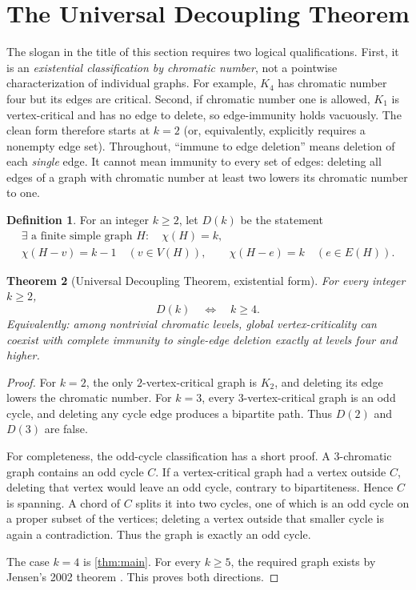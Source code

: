 \documentclass[10pt]{amsart}
\newtheorem{theorem}{Theorem}[section]
\theoremstyle{definition}
\newtheorem{definition}[theorem]{Definition}
\begin{document}
\section{The Universal Decoupling Theorem}\label{sec:universal}

The slogan in the title of this section requires two logical qualifications.
First, it is an \emph{existential classification by chromatic number}, not a
pointwise characterization of individual graphs.  For example, $K_4$ has
chromatic number four but its edges are critical.  Second, if chromatic number
one is allowed, $K_1$ is vertex-critical and has no edge to delete, so
edge-immunity holds vacuously.  The clean form therefore starts at $k=2$ (or,
equivalently, explicitly requires a nonempty edge set).
Throughout, ``immune to edge deletion'' means deletion of each \emph{single}
edge.  It cannot mean immunity to every set of edges: deleting all edges of a
graph with chromatic number at least two lowers its chromatic number to one.

\begin{definition}
For an integer $k\geq2$, let $D(k)$ be the statement
\[
 \begin{gathered}
 \exists\text{ a finite simple graph }H:\quad \chi(H)=k,\\
 \chi(H-v)=k-1\quad(v\in V(H)),\qquad
 \chi(H-e)=k\quad(e\in E(H)).
 \end{gathered}
\]
\end{definition}

\begin{theorem}[Universal Decoupling Theorem, existential form]
\label{thm:universal}
For every integer $k\geq2$,
\[
                    D(k)\quad\Longleftrightarrow\quad k\geq4.
\]
Equivalently: among nontrivial chromatic levels, global vertex-criticality can
coexist with complete immunity to single-edge deletion exactly at levels four
and higher.
\end{theorem}

\begin{proof}
For $k=2$, the only $2$-vertex-critical graph is $K_2$, and deleting its edge
lowers the chromatic number.  For $k=3$, every $3$-vertex-critical graph is an
odd cycle, and deleting any cycle edge produces a bipartite path.  Thus
$D(2)$ and $D(3)$ are false.

For completeness, the odd-cycle classification has a short proof.  A
$3$-chromatic graph contains an odd cycle $C$.  If a vertex-critical graph
had a vertex outside $C$, deleting that vertex would leave an odd cycle,
contrary to bipartiteness.  Hence $C$ is spanning.  A chord of $C$ splits it
into two cycles, one of which is an odd cycle on a proper subset of the
vertices; deleting a vertex outside that smaller cycle is again a
contradiction.  Thus the graph is exactly an odd cycle.

The case $k=4$ is \cref{thm:main}.  For every $k\geq5$, the required graph
exists by Jensen's 2002 theorem \cite{Jensen2002}.  This proves both
directions.
\end{proof}
\end{document}
